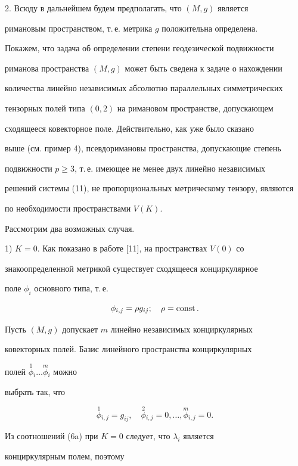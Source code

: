 2. Всюду в дальнейшем будем предполагать, что $(M,g)$ является 


римановым пространством, т.\,е. метрика $g$ положительна определена. 


Покажем, что задача об определении степени геодезической подвижности 


риманова пространства $(M,g)$ может быть сведена к задаче о нахождении 


количества линейно независимых абсолютно параллельных симметрических 


тензорных полей типа $(0, 2)$ на римановом пространстве, допускающем 


сходящееся ковекторное поле. Действительно, как уже было сказано 


выше (см. пример 4), псевдоримановы пространства, допускающие степень 


подвижности $p \ge 3$, т.\,е. имеющее не менее двух линейно независимых 


решений системы (11), не пропорциональных метрическому тензору, являются 


по необходимости пространствами $V(K)$.


Рассмотрим два возможных случая.





1) $K=0$. Как показано в работе [11], на пространствах $V(0)$ со 


знакоопределенной метрикой существует сходящееся конциркулярное 


поле $\phi_i$ основного типа, т.\,е.


$$


\phi_{i,j}=\rho g_{ij}; \quad \rho= \const.


$$


Пусть $(M,g)$ допускает $m$ линейно независимых конциркулярных 


ковекторных полей. Базис линейного пространства конциркулярных 


полей $\overset{1} {\phi}{}_i\dotsc\overset{m} {\phi}{}_i$ можно


выбрать так, что


$$


\overset{1} {\phi}{}_{i,j}=g_{ij},


\quad\overset{2} {\phi}{}_{i,j}=0, \dotsc,\overset{m} {\phi}{}_{i,j}=0.


$$


Из соотношений (6a) при $K=0$ следует, что $\lambda_i$ является 


конциркулярным полем, поэтому


